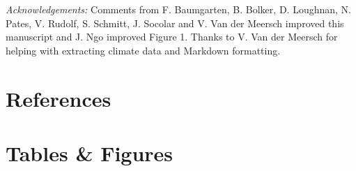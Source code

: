 \documentclass[11pt]{article}
\begin{document}

\emph{Acknowledgements:} Comments from F. Baumgarten, B. Bolker, D. Loughnan, N. Pates, V. Rudolf, S. Schmitt, J. Socolar and V. Van der Meersch improved this manuscript and J. Ngo improved Figure 1. Thanks to V. Van der Meersch for helping with extracting climate data and Markdown formatting. 

\newpage
\section*{References}
\vspace{-5ex}


\clearpage

\section*{Tables \& Figures}
\end{document}
